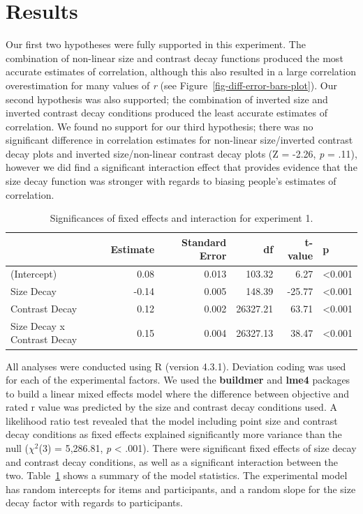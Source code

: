 \documentclass[manuscript, review, anonymous, screen]{acmart}
\begin{document}
\hypertarget{sec-results}{%
\section{Results}\label{sec-results}}

Our first two hypotheses were fully supported in this experiment. The
combination of non-linear size and contrast decay functions produced the
most accurate estimates of correlation, although this also resulted in a
large correlation overestimation for many values of \emph{r} (see
Figure~\ref{fig-diff-error-bars-plot}). Our second hypothesis was also
supported; the combination of inverted size and inverted contrast decay
conditions produced the least accurate estimates of correlation. We
found no support for our third hypothesis; there was no significant
difference in correlation estimates for non-linear size/inverted
contrast decay plots and inverted size/non-linear contrast decay plots
(Z = -2.26, \emph{p} = .11), however we did find a significant
interaction effect that provides evidence that the size decay function
was stronger with regards to biasing people's estimates of correlation.

\hypertarget{tbl-sig}{}
\begin{table}
\caption{\label{tbl-sig}Significances of fixed effects and interaction for experiment 1. }\tabularnewline

\centering
\begin{tabular}{lrrrrl}
\toprule
  & Estimate & Standard Error & df & t-value & p\\
\midrule
(Intercept) & 0.08 & 0.013 & 103.32 & 6.27 & <0.001\\
Size Decay & -0.14 & 0.005 & 148.39 & -25.77 & <0.001\\
Contrast Decay & 0.12 & 0.002 & 26327.21 & 63.71 & <0.001\\
Size Decay x Contrast Decay & 0.15 & 0.004 & 26327.13 & 38.47 & <0.001\\
\bottomrule
\end{tabular}
\end{table}

All analyses were conducted using R (version 4.3.1). Deviation coding
was used for each of the experimental factors. We used the
\textbf{buildmer} and \textbf{lme4} packages to build a linear mixed
effects model where the difference between objective and rated r value
was predicted by the size and contrast decay conditions used. A
likelihood ratio test revealed that the model including point size and
contrast decay conditions as fixed effects explained significantly more
variance than the null (\(\chi^2\)(3) = 5,286.81, \emph{p} \textless{}
.001). There were significant fixed effects of size decay and contrast
decay conditions, as well as a significant interaction between the two.
Table~\ref{tbl-sig} shows a summary of the model statistics. The
experimental model has random intercepts for items and participants, and
a random slope for the size decay factor with regards to participants.
\end{document}
